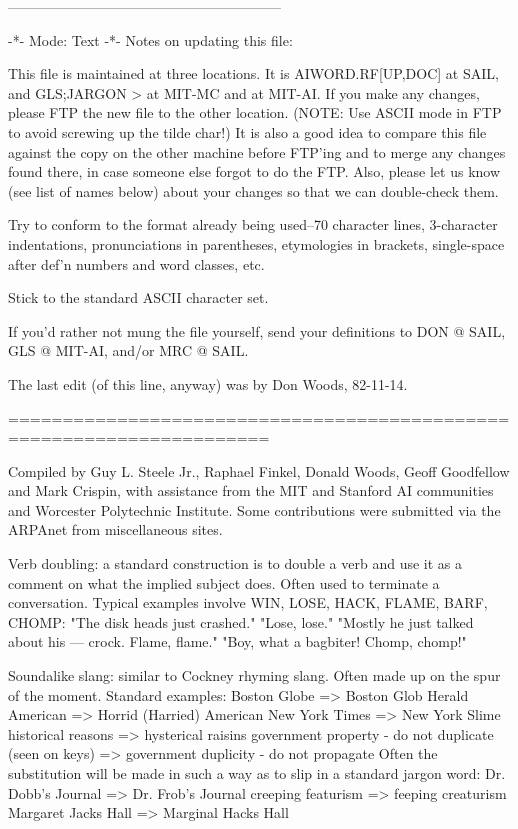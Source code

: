 -----------------------------------------------------------

	  -*- Mode: Text -*-   Notes on updating this file:

This file is maintained at three locations.   It is  AIWORD.RF[UP,DOC]
at SAIL, and GLS;JARGON >  at MIT-MC and at MIT-AI.   If you make  any
changes, please FTP the new file to the other location.	  (NOTE:   Use
ASCII mode in FTP to avoid screwing up the tilde char!)	  It is also a
good idea to compare this file	against the copy on the other  machine
before FTP'ing and to merge any	 changes found there,  in case someone
else forgot to do the FTP.    Also, please  let us know	 (see list  of
names below) about your changes so that we can double-check them.

Try to conform to the format already being used--70 character lines,
3-character indentations, pronunciations in parentheses, etymologies
in brackets, single-space after def'n numbers and word classes, etc.

Stick to the standard ASCII character set.

If you'd rather not mung the file yourself, send your definitions to
DON @ SAIL, GLS @ MIT-AI, and/or MRC @ SAIL.

The last edit (of this line, anyway) was by Don Woods, 82-11-14.

======================================================================

	Compiled by Guy L. Steele Jr., Raphael Finkel, Donald
	Woods,	Geoff  Goodfellow  and	Mark  Crispin,	 with
	assistance from the MIT	 and Stanford AI  communities
	and   Worcester	   Polytechnic	  Institute.	 Some
	contributions were  submitted  via the	ARPAnet	 from
	miscellaneous sites.

Verb doubling: a standard construction is to double a verb and use it
   as a comment on what the implied subject does.  Often used to
   terminate a conversation.  Typical examples involve WIN, LOSE,
   HACK, FLAME, BARF, CHOMP:
	"The disk heads just crashed."	"Lose, lose."
	"Mostly he just talked about his --- crock.  Flame, flame."
	"Boy, what a bagbiter!	Chomp, chomp!"

Soundalike slang: similar to Cockney rhyming slang.  Often made up on
   the spur of the moment.  Standard examples:
	Boston Globe => Boston Glob
	Herald American => Horrid (Harried) American
	New York Times => New York Slime
	historical reasons => hysterical raisins
	government property - do not duplicate (seen on keys)
		=> government duplicity - do not propagate
   Often the substitution will be made in such a way as to slip in
   a standard jargon word:
	Dr. Dobb's Journal => Dr. Frob's Journal
	creeping featurism => feeping creaturism
	Margaret Jacks Hall => Marginal Hacks Hall

